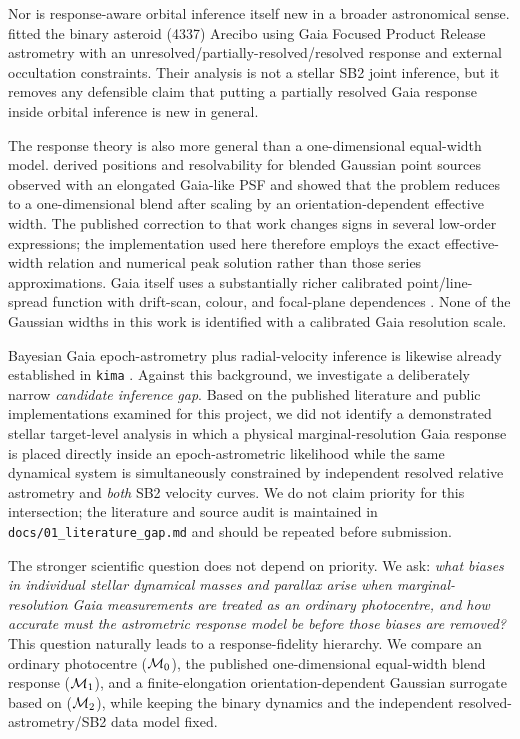 Nor is response-aware orbital inference itself new in a broader astronomical sense. \citet{Liu2024} fitted the binary asteroid (4337) Arecibo using Gaia Focused Product Release astrometry with an unresolved/partially-resolved/resolved response and external occultation constraints. Their analysis is not a stellar SB2 joint inference, but it removes any defensible claim that putting a partially resolved Gaia response inside orbital inference is new in general.

The response theory is also more general than a one-dimensional equal-width model. \citet{Penoyre2026} derived positions and resolvability for blended Gaussian point sources observed with an elongated Gaia-like PSF and showed that the problem reduces to a one-dimensional blend after scaling by an orientation-dependent effective width. The published correction to that work changes signs in several low-order expressions; the implementation used here therefore employs the exact effective-width relation and numerical peak solution rather than those series approximations. Gaia itself uses a substantially richer calibrated point/line-spread function with drift-scan, colour, and focal-plane dependences \citep{Rowell2021,Rowell2026}. None of the Gaussian widths in this work is identified with a calibrated Gaia resolution scale.

Bayesian Gaia epoch-astrometry plus radial-velocity inference is likewise already established in \texttt{kima} \citep{Baycroft2026}. Against this background, we investigate a deliberately narrow \emph{candidate inference gap}. Based on the published literature and public implementations examined for this project, we did not identify a demonstrated stellar target-level analysis in which a physical marginal-resolution Gaia response is placed directly inside an epoch-astrometric likelihood while the same dynamical system is simultaneously constrained by independent resolved relative astrometry and \emph{both} SB2 velocity curves. We do not claim priority for this intersection; the literature and source audit is maintained in \texttt{docs/01\_literature\_gap.md} and should be repeated before submission.

The stronger scientific question does not depend on priority. We ask: \emph{what biases in individual stellar dynamical masses and parallax arise when marginal-resolution Gaia measurements are treated as an ordinary photocentre, and how accurate must the astrometric response model be before those biases are removed?} This question naturally leads to a response-fidelity hierarchy. We compare an ordinary photocentre ($\mathcal{M}_0$), the published one-dimensional equal-width blend response ($\mathcal{M}_1$), and a finite-elongation orientation-dependent Gaussian surrogate based on \citet{Penoyre2026} ($\mathcal{M}_2$), while keeping the binary dynamics and the independent resolved-astrometry/SB2 data model fixed.

